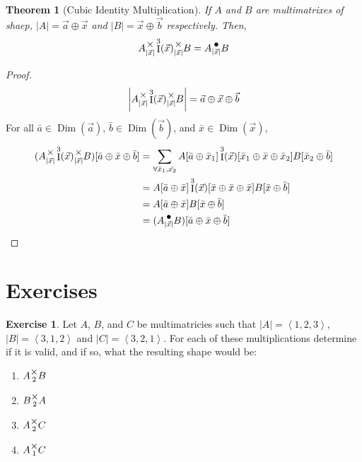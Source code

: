 \documentclass[12pt]{book}
\theoremstyle{plain}
\newtheorem{theorem}{Theorem}[chapter]
\theoremstyle{definition}
\newtheorem{exercise}{Exercise}[chapter]
\theoremstyle{ppart}
\theoremstyle{case}
\theoremstyle{solution}
\DeclareMathOperator{\Dim}{Dim}
\DeclareMathOperator{\Ident}{I}
\newcommand{\mmult}[1]{\text{\raisebox{1ex}{$\underset{#1}{\times}$}}}
\newcommand{\dmult}[1]{\text{\raisebox{1ex}{$\underset{#1}{\,\bullet\,}$}}}
\newcommand{\shape}[1]{\left|#1\right|}
\begin{document}
\begin{theorem}[Cubic Identity Multiplication]
\label{hada_cubic}
If $A$ and $B$ are multimatrixes of shaep, $\shape{A} = \vec{a} \oplus \vec{x}$
and $\shape{B} = \vec{x} \oplus \vec{b}$ respectively. Then,
\[ A \mmult{\shape{\vec{x}}} \Ident^3(\vec{x}) \mmult{\shape{\vec{x}}} B = A \dmult{\shape{\vec{x}}} B \]
\end{theorem}
\begin{proof}
\[ \shape{A \mmult{\shape{\vec{x}}} \Ident^3(\vec{x}) \mmult{\shape{\vec{x}}} B} = \vec{a} \oplus \vec{x} \oplus \vec{b}  \]
For all $\bar{a} \in \Dim(\vec{a})$, $\bar{b} \in \Dim(\vec{b})$, and $\bar{x} \in \Dim(\vec{x})$, 
\begin{align*}
  (A \mmult{\shape{\vec{x}}} \Ident^3(\vec{x}) \mmult{\shape{\vec{x}}} B)[\bar{a} \oplus \bar{x} \oplus \bar{b}]
  &= \sum_{\forall \bar{x}_1, \bar{x_2}} A[\bar{a} \oplus \bar{x}_1] \Ident^3(\vec{x})[\bar{x}_1 \oplus \bar{x} \oplus \bar{x}_2] B[\bar{x}_2 \oplus \bar{b}] \\
  &= A[\bar{a} \oplus \bar{x}] \Ident^3(\vec{x})[\bar{x} \oplus \bar{x} \oplus \bar{x}] B[\bar{x} \oplus \bar{b}] \\
  &= A[\bar{a} \oplus \bar{x}] B[\bar{x} \oplus \bar{b}] \\
  &= (A \dmult{\shape{\vec{x}}} B) [\bar{a} \oplus \bar{x} \oplus \bar{b}]
\end{align*}
\end{proof}

\section{Exercises}

\begin{exercise}
Let $A$, $B$, and $C$ be multimatricies such that $\shape{A} = \left<1,2,3\right>$,
$\shape{B} = \left<3,1,2\right>$ and $\shape{C} = \left<3,2,1\right>$. For each of these
multiplications determine if it is valid, and if so, what the resulting
shape would be:
\begin{enumerate}
\item $A \mmult{2} B$
\item $B \mmult{2} A$
\item $A \mmult{2} C$
\item $A \mmult{1} C$
\end{enumerate}
\end{exercise}
\end{document}
